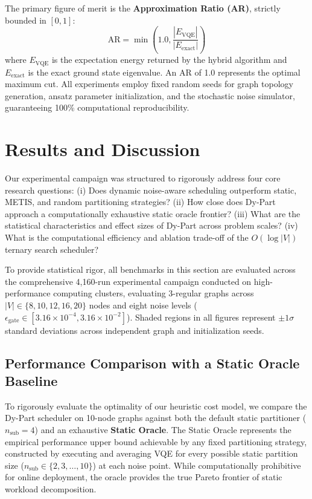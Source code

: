 \documentclass[pdflatex,sn-mathphys-num]{sn-jnl}
\theoremstyle{thmstyleone}
\theoremstyle{thmstyletwo}%
\theoremstyle{thmstylethree}%
\begin{document}
The primary figure of merit is the \textbf{Approximation Ratio (AR)}, strictly bounded in $[0, 1]$:
\begin{equation}
    \text{AR} = \min\left(1.0, \frac{|E_{\text{VQE}}|}{|E_{\text{exact}}|}\right)
\end{equation}
where $E_{\text{VQE}}$ is the expectation energy returned by the hybrid algorithm and $E_{\text{exact}}$ is the exact ground state eigenvalue. An AR of 1.0 represents the optimal maximum cut. All experiments employ fixed random seeds for graph topology generation, ansatz parameter initialization, and the stochastic noise simulator, guaranteeing 100\% computational reproducibility.




\section{Results and Discussion}\label{sec5}

Our experimental campaign was structured to rigorously address four core research questions:
(i) Does dynamic noise-aware scheduling outperform static, METIS, and random partitioning strategies?
(ii) How close does Dy-Part approach a computationally exhaustive static oracle frontier?
(iii) What are the statistical characteristics and effect sizes of Dy-Part across problem scales?
(iv) What is the computational efficiency and ablation trade-off of the $O(\log |V|)$ ternary search scheduler?

To provide statistical rigor, all benchmarks in this section are evaluated across the comprehensive 4,160-run experimental campaign conducted on high-performance computing clusters, evaluating 3-regular graphs across $|V| \in \{8, 10, 12, 16, 20\}$ nodes and eight noise levels ($\epsilon_{\text{gate}} \in [3.16 \times 10^{-4}, 3.16 \times 10^{-2}]$). Shaded regions in all figures represent $\pm 1\sigma$ standard deviations across independent graph and initialization seeds.

\subsection{Performance Comparison with a Static Oracle Baseline}
\label{subsec:oracle_comparison}

To rigorously evaluate the optimality of our heuristic cost model, we compare the Dy-Part scheduler on 10-node graphs against both the default static partitioner ($n_{\text{sub}}=4$) and an exhaustive \textbf{Static Oracle}. The Static Oracle represents the empirical performance upper bound achievable by any fixed partitioning strategy, constructed by executing and averaging VQE for every possible static partition size ($n_{\text{sub}} \in \{2, 3, \dots, 10\}$) at each noise point. While computationally prohibitive for online deployment, the oracle provides the true Pareto frontier of static workload decomposition.
\end{document}
